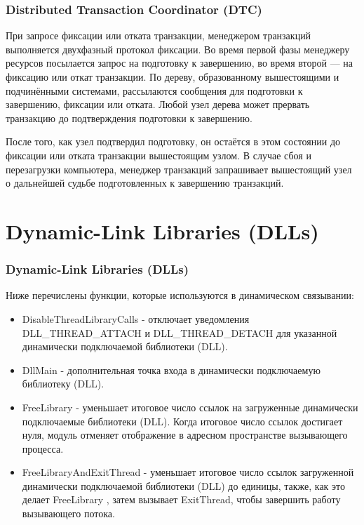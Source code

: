 \documentclass{beamer}
\begin{document}
\begin{frame}[fragile]
\frametitle{Distributed Transaction Coordinator (DTC)}

При запросе фиксации или отката транзакции, менеджером транзакций выполняется двухфазный протокол фиксации. Во время первой фазы менеджеру ресурсов посылается запрос на подготовку к завершению, во время второй — на фиксацию или откат транзакции. По дереву, образованному вышестоящими и подчинёнными системами, рассылаются сообщения для подготовки к завершению, фиксации или отката. Любой узел дерева может прервать транзакцию до подтверждения подготовки к завершению.
\medskip

После того, как узел подтвердил подготовку, он остаётся в этом состоянии до фиксации или отката транзакции вышестоящим узлом. В случае сбоя и перезагрузки компьютера, менеджер транзакций запрашивает вышестоящий узел о дальнейшей судьбе подготовленных к завершению транзакций.

\end{frame}

\section{Dynamic-Link Libraries (DLLs)}

\begin{frame}
\frametitle{Dynamic-Link Libraries (DLLs)}

Ниже перечислены функции, которые используются в динамическом связывании:

\begin{itemize}
\item DisableThreadLibraryCalls - отключает уведомления DLL\_THREAD\_ATTACH и DLL\_THREAD\_DETACH для указанной динамически подключаемой библиотеки (DLL). 
\item DllMain - дополнительная точка входа в динамически подключаемую библиотеку (DLL).
\item FreeLibrary - уменьшает итоговое число ссылок на загруженные динамически подключаемые библиотеки (DLL). Когда итоговое число ссылок достигает нуля, модуль отменяет отображение в адресном пространстве вызывающего процесса.
\item FreeLibraryAndExitThread - уменьшает итоговое число ссылок загруженной динамически подключаемой библиотеки (DLL) до единицы, также, как это делает FreeLibrary , затем вызывает ExitThread, чтобы завершить работу вызывающего потока.
\end{itemize}

\end{frame}
\end{document}

